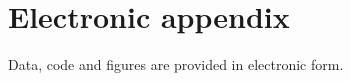 \documentclass[12pt]{article}
\begin{document}
\section{Electronic appendix}
\label{el_app}

Data, code and figures are provided in electronic form.

\newpage
    

\RaggedRight



% 

\end{document}
